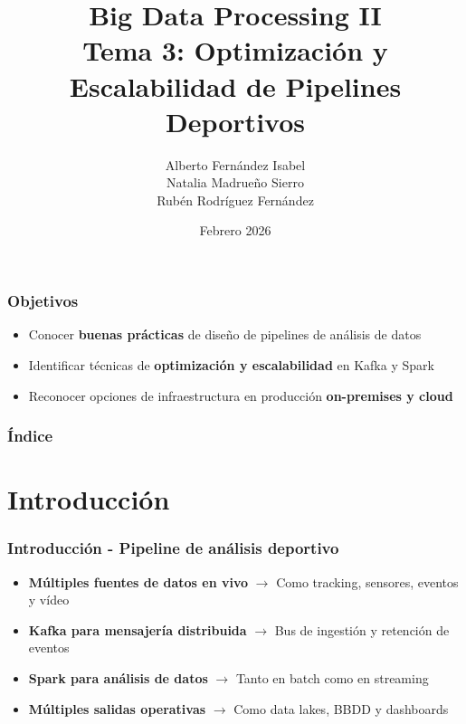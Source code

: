 \documentclass[aspectratio=169]{beamer}
\institute[URJC]{DSLAB}
\author[Big Data Processing II]{
	Alberto Fernández Isabel \\
	Natalia Madrueño Sierro \\
	Rubén Rodríguez Fernández \\
}
\title[Tema 3: Optimización y Escalabilidad]{
	Big Data Processing II \\ \vspace{0.2em}
	\large{Tema 3: Optimización y Escalabilidad de Pipelines Deportivos}
}
\date{Febrero 2026}
\begin{document}
\begin{frame}
  \titlepage
\end{frame}

\begin{frame}
\frametitle{Objetivos}
	\begin{itemize}
		\item Conocer \textbf{buenas prácticas} de diseño de pipelines de análisis de datos
		\item Identificar técnicas de \textbf{optimización y escalabilidad} en Kafka y Spark
		\item Reconocer opciones de infraestructura en producción \textbf{on-premises y cloud}
	\end{itemize}
\end{frame}

\begin{frame}
\frametitle{Índice}
	\tableofcontents
\end{frame}

\section{Introducción}

\begin{frame}\frametitle{Introducción - Pipeline de análisis deportivo}
  \begin{itemize}
    \item \textbf{Múltiples fuentes de datos en vivo} $\rightarrow$ Como tracking, sensores, eventos y vídeo

    \vspace{1em}
      
    \item \textbf{Kafka para mensajería distribuida} $\rightarrow$ Bus de ingestión y retención de eventos

    \vspace{1em}

    \item \textbf{Spark para análisis de datos} $\rightarrow$ Tanto en batch como en streaming

    \vspace{1em}

    \item \textbf{Múltiples salidas operativas} $\rightarrow$ Como data lakes, BBDD y dashboards
  \end{itemize}
\end{frame}
\end{document}
